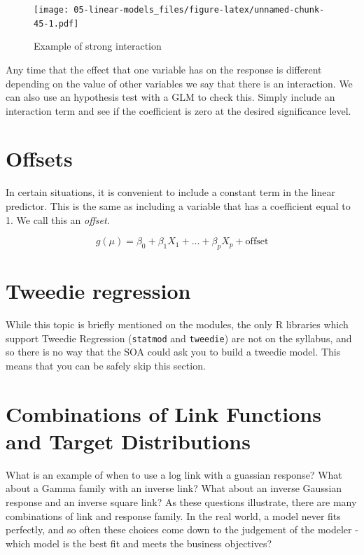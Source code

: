 \documentclass[
  openany]{book}
\begin{document}
\begin{figure}
\centering
\texttt{[image: 05-linear-models\_files/figure-latex/unnamed-chunk-45-1.pdf]}
\caption{\label{fig:unnamed-chunk-45}Example of strong interaction}
\end{figure}

Any time that the effect that one variable has on the response is different depending on the value of other variables we say that there is an interaction. We can also use an hypothesis test with a GLM to check this. Simply include an interaction term and see if the coefficient is zero at the desired significance level.

\hypertarget{offsets}{%
\section{Offsets}\label{offsets}}

In certain situations, it is convenient to include a constant term in the linear predictor. This is the same as including a variable that has a coefficient equal to 1. We call this an \emph{offset}.

\[g(\mu) = \beta_0 + \beta_1 X_1 + ... + \beta_p X_p + \text{offset}\]

\hypertarget{tweedie-regression}{%
\section{Tweedie regression}\label{tweedie-regression}}

While this topic is briefly mentioned on the modules, the only R libraries which support Tweedie Regression (\texttt{statmod} and \texttt{tweedie}) are not on the syllabus, and so there is no way that the SOA could ask you to build a tweedie model. This means that you can be safely skip this section.

\hypertarget{combinations-of-link-functions-and-target-distributions}{%
\section{Combinations of Link Functions and Target Distributions}\label{combinations-of-link-functions-and-target-distributions}}

What is an example of when to use a log link with a guassian response? What about a Gamma family with an inverse link? What about an inverse Gaussian response and an inverse square link? As these questions illustrate, there are many combinations of link and response family. In the real world, a model never fits perfectly, and so often these choices come down to the judgement of the modeler - which model is the best fit and meets the business objectives?
\end{document}
